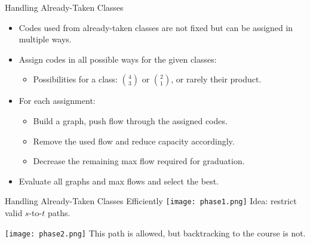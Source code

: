\documentclass{beamer}
\begin{document}
\begin{frame}{Handling Already-Taken Classes}
    \begin{itemize}
        \item Codes used from already-taken classes are not fixed but can be assigned in multiple ways.
        \item Assign codes in all possible ways for the given classes:
        \begin{itemize}
            \item Possibilities for a class: \( \binom{4}{3} \) or \( \binom{2}{1} \), or rarely their product.
        \end{itemize}
        \item For each assignment:
        \begin{itemize}
            \item Build a graph, push flow through the assigned codes.
            \item Remove the used flow and reduce capacity accordingly.
            \item Decrease the remaining max flow required for graduation.
        \end{itemize}
        \item Evaluate all graphs and max flows and select the best.
    \end{itemize}
\end{frame}

\begin{frame}{Handling Already-Taken Classes Efficiently}
    \centering
    \texttt{[image: phase1.png]}
    \vspace{0.5cm}
    \small Idea: restrict valid \( s \)-to-\( t \) paths.
\end{frame}

\begin{frame}
    \centering
    \texttt{[image: phase2.png]}
    \vspace{0.5cm}
    \small This path is allowed, but backtracking to the course is not.
\end{frame}
\end{document}
